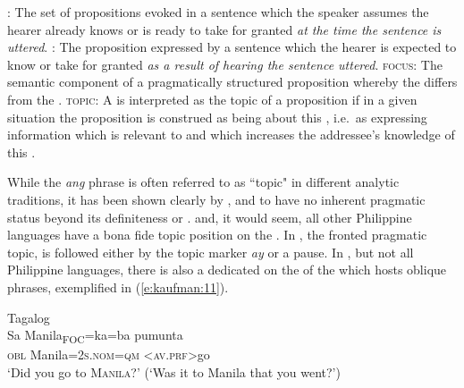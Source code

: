\documentclass[output=paper]{langsci/langscibook}
\begin{document}
\begin{exe}
	\ex
	 \label{e:kaufman:10}
	\begin{xlist}
		 \citep[52, 213, 131]{Lambrecht1994}
		\ex\label{e:kaufman:10a} \textsc{:} The set of propositions  evoked in a sentence which the speaker assumes the hearer already knows or is ready to take for granted \emph{at the time the sentence is uttered}.
		\ex\label{e:kaufman:10b} {\textsc{:} The proposition expressed by a sentence which the hearer is expected to know or take for granted \emph{as a result of hearing the sentence uttered}.}
		\ex\label{e:kaufman:10c} {\textsc{focus:} The semantic component of a pragmatically structured proposition whereby the  differs from the .}
		\ex\label{e10d} {\textsc{topic:} A  is interpreted as the topic of a proposition if in a given situation the proposition is construed as being about this , i.e.\ as expressing information which is relevant to and which increases the addressee's knowledge of this . }
	\end{xlist}
\end{exe}

\noindent
While the  \textit{ang} phrase is often referred to as ``topic" in different analytic traditions, it has been shown clearly by \citet{Naylor:1975}, \citet{Kroeger:1993} and \citet{Kaufman:2005} to have no inherent pragmatic status beyond its definiteness or .  and, it would seem, all other Philippine languages have a bona fide topic position on the . In , the fronted pragmatic topic, is followed either by the topic marker \textit{ay} or a pause. In , but not all Philippine languages, there is also a dedicated  on the  of the  which hosts oblique phrases, exemplified in (\ref{e:kaufman:11}). 

\begin{exe}
	\ex\label{e:kaufman:11}{Tagalog}\\
	\gll {\ob}Sa Manila{\cb}\textsubscript{FOC}=ka=ba p{\USSmaller}um{\USGreater}unta{\USQMark}\\
	\phantom{[}\textsc{obl} Manila=\textsc{2s.nom=qm} <\textsc{av.prf}>go\\
	\glt `Did you go to \textsc{Manila}?' (`Was it to Manila that you went?') \citep[182]{Kaufman:2005}
\end{exe}
\end{document}
